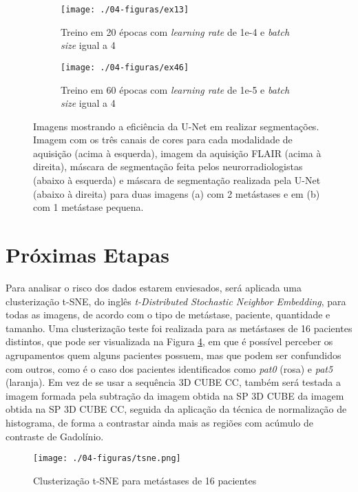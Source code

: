 \begin{figure}[!htb]
\centering
     \begin{subfigure}[b]{0.45\textwidth}
         \centering
         \texttt{[image: ./04-figuras/ex13]}
         \caption{Treino em 20 épocas com \textit{learning rate} de 1e-4 e \textit{batch size} igual a 4}
         \label{fig:ex13}
     \end{subfigure}
     \hfill
     \begin{subfigure}[b]{0.45\textwidth}
         \centering
         \texttt{[image: ./04-figuras/ex46]}
         \caption{Treino em 60 épocas com \textit{learning rate} de 1e-5 e \textit{batch size} igual a 4}
         \label{fig:ex46}
     \end{subfigure}
    \caption{Imagens mostrando a eficiência da U-Net em realizar segmentações. Imagem com os três canais de cores para cada modalidade de aquisição (acima à esquerda), imagem da aquisição FLAIR (acima à direita), máscara de segmentação feita pelos neurorradiologistas (abaixo à esquerda) e máscara de segmentação realizada pela U-Net (abaixo à direita) para duas imagens (a)  com 2 metástases e em (b) com 1 metástase pequena.} \label{fig:estadorc}\vspace{0.2cm}
\end{figure}

\section{Próximas Etapas}

Para analisar o risco dos dados estarem enviesados, será aplicada uma clusterização t-SNE, do inglês \textit{t-Distributed Stochastic Neighbor Embedding}, para todas as imagens, de acordo com o tipo de metástase, paciente, quantidade e tamanho. Uma clusterização teste foi realizada para as metástases de 16 pacientes distintos, que pode ser visualizada na Figura \ref{fig:tsne}, em que é possível perceber os agrupamentos quem alguns pacientes possuem, mas que podem ser confundidos com outros, como é o caso dos pacientes identificados como \textit{pat0} (rosa) e \textit{pat5} (laranja). Em vez de se usar a sequência 3D CUBE CC, também será testada a imagem formada pela subtração da imagem obtida na SP 3D CUBE da imagem obtida na SP 3D CUBE CC, seguida da aplicação da técnica de normalização de histograma, de forma a contrastar ainda mais as regiões com acúmulo de contraste de Gadolínio.

\begin{figure}[!htb]
\centering
    \texttt{[image: ./04-figuras/tsne.png]}
	\caption{Clusterização t-SNE para metástases de 16 pacientes}\vspace{-0.2cm}
    \label{fig:tsne}
\end{figure}

